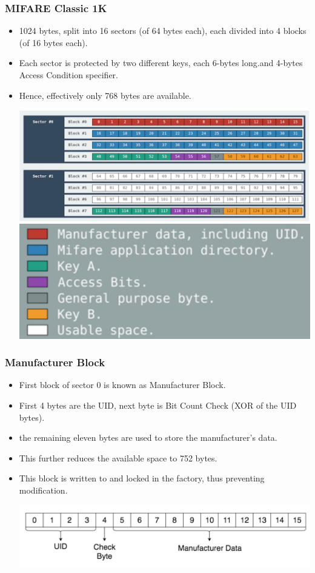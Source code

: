 \documentclass[12pt]{beamer}
\begin{document}
\begin{frame}
\frametitle{MIFARE Classic 1K}
\begin{itemize}
	\item 1024 bytes, split into 16 sectors (of 64 bytes each), each divided into 4 blocks (of 16 bytes each).
	\item Each sector is protected by two different keys, each 6-bytes long.and 4-bytes Access Condition specifier.
	\item Hence, effectively only 768 bytes are available.
	\begin{center}
		\includegraphics[width=0.85\linewidth]{mfc-sectors} \includegraphics[width=0.35\linewidth]{mfc-sectors-legend}
	\end{center}
\end{itemize}
\end{frame}

\begin{frame}
\frametitle{Manufacturer Block}
\begin{itemize}
	\item First block of sector 0 is known as Manufacturer Block.
	\item First 4 bytes are the UID, next byte is Bit Count Check (XOR of the UID bytes).
	\item the remaining eleven bytes are used to store the manufacturer's data.
	\item This further reduces the available space to 752 bytes.
	\item This block is written to and locked in the factory, thus preventing modification.
	\begin{center}
		\includegraphics[width=\linewidth]{manufacturer-block}
	\end{center}
\end{itemize}
\end{frame}
\end{document}
